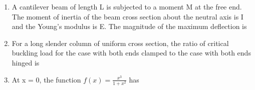 \documentclass[journal,11pt,onecolumn]{IEEEtran}
\begin{document}
\begin{enumerate}
    \item A cantilever beam of length L is subjected to a moment M at the free end. The moment of inertia of the beam cross section about the neutral axis is I and the Young's modulus is E. The magnitude of the maximum deflection is

          \begin{enumerate}
          \end{enumerate}

    \item For a long slender column of uniform cross section, the ratio of critical buckling load for the case with both ends clamped to the case with both ends hinged is

          \begin{enumerate}
          \end{enumerate}

    \item At x = 0, the function \(f(x) = \frac{x^3}{1+x^2}\) has

          \begin{enumerate}
          \end{enumerate}


\end{enumerate}
\end{document}
